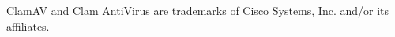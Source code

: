 \documentclass[a4paper,titlepage,english]{book}
\begin{document}
\vspace{0.3cm}
\noindent
\begin{boxedminipage}[b]{\textwidth}
    ClamAV and Clam AntiVirus are trademarks of Cisco Systems, Inc. and/or its affiliates.
\end{boxedminipage}
\setlength{\parindent}{18pt}
\mainmatter







%
%

%
\backmatter

\end{document}
